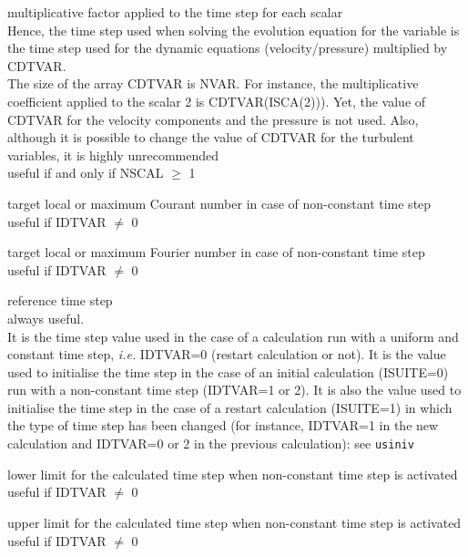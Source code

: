 {multiplicative factor applied to the time step for each scalar\\
Hence, the time step used when solving the evolution equation for the
variable is the time step used for the dynamic equations (velocity/pressure) 
multiplied by CDTVAR.\\
The size of the array CDTVAR is NVAR. For instance, the multiplicative
coefficient applied to the scalar 2 is CDTVAR(ISCA(2))). Yet, the value of CDTVAR
for the velocity components and the pressure is not used. Also, although it is
possible to change the value of CDTVAR for the turbulent variables, it is 
highly unrecommended\\
useful if and only if NSCAL $\geqslant$ 1}


{target local or maximum Courant number in case of non-constant time step\\
useful if IDTVAR $\ne$ 0}

{target local or maximum Fourier number in case of non-constant time step\\
useful if IDTVAR $\ne$ 0}

{reference time step \\
always useful.\\
It is the time step value used in the case of a calculation run with a
uniform and constant time step, {\em i.e.} IDTVAR=0 (restart calculation
or not). It is the value used to initialise the time step in the case of
an initial calculation (ISUITE=0) run with a non-constant time step
(IDTVAR=1 or 2). It is also the value used to initialise the time step
in the case of a restart calculation (ISUITE=1) in which the type of
time step has been changed (for instance, IDTVAR=1 in the new
calculation and IDTVAR=0 or 2 in the previous calculation): see
\texttt{usiniv}} 

{lower limit for the calculated time step when non-constant time step is activated\\
useful if IDTVAR $\ne$ 0}

{upper limit for the calculated time step when non-constant time step is activated\\
useful if IDTVAR $\ne$ 0}

